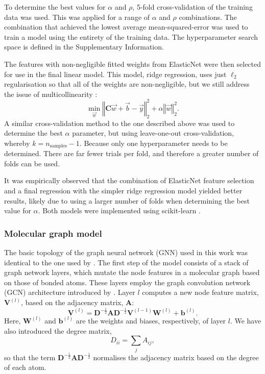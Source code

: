 To determine the best values for $\alpha$ and $\rho$, 5-fold cross-validation of
the training data was used. This was applied for a range of $\alpha$ and $\rho$
combinations. The combination that achieved the lowest average
mean-squared-error was used to train a model using the entirety of the training
data. The hyperparameter search space is defined in the Supplementary
Information.

The features with non-negligible fitted weights from ElasticNet were then selected for use in the final linear model. This model, ridge regression, uses just $\ell_2$ regularisation so that all of the weights are non-negligible, but we
still address the issue of multicollinearity \cite{mcdonaldRidgeRegression2009}:
\begin{equation}
    \min_{\vec{w}} \left \Vert \mathbf{C} \vec{w} + \vec{b} - \vec{y} \right \Vert_2^2 + \alpha \left \Vert \vec{w}\right \Vert_2^2.
\end{equation}
A similar cross-validation method to the one described above was used to determine the best $\alpha$ parameter, but using leave-one-out cross-validation, whereby $k=n_\text{samples}-1$. Because only one hyperparameter needs to be determined. There are far fewer trials per
fold, and therefore a greater number of folds can be used.

It was empirically observed that the combination of ElasticNet feature selection and a final regression with the simpler ridge regression model yielded better results, likely due to using a larger number of folds when determining the best value for $\alpha$. Both models were implemented using scikit-learn \cite{pedregosaScikitlearnMachineLearning2011}.

\subsubsection{Molecular graph model}

The basic topology of the graph neural network (GNN) used in this work was
identical to the one used by \citet{qinPredictingCriticalMicelle2021}. The first
step of the model consists of a stack of graph network layers, which mutate the
node features in a molecular graph based on those of bonded atoms. These layers
employ the graph convolution network (GCN) architecture introduced by
\citet{kipfSemiSupervisedClassificationGraph2017}. Layer $l$ computes a new node
feature matrix, $\mathbf{V}^{(l)}$, based on the adjacency matrix, $\mathbf{A}$:
\begin{equation}
    \mathbf{V}^{(l)} = \mathbf{D}^{-\frac{1}{2}} \mathbf{A} \mathbf{D}^{-\frac{1}{2}} \mathbf{V}^{(l-1)} \mathbf{W}^{(l)} + \mathbf{b}^{(l)}.
\end{equation}
Here, $\mathbf{W}^{(l)}$ and $\mathbf{b}^{(l)}$ are the weights and biases,
respectively, of layer $l$. We have also introduced the degree matrix,
\begin{equation}
    D_{ii} = \sum_j A_{ij},
\end{equation}
so that the term $\mathbf{D}^{-\frac{1}{2}} \mathbf{A} \mathbf{D}^{-\frac{1}{2}}$ normalises the
    adjacency matrix based on the degree of each atom.

